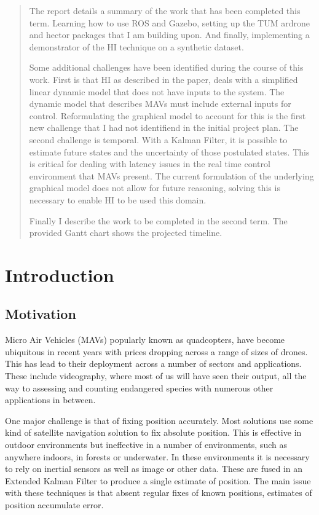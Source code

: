\documentclass[]{../resources/final_report}
\begin{document}
\begin{abstract}
The report details a summary of the work that has been completed this term. Learning how to
use ROS and Gazebo, setting up the TUM ardrone and hector packages that I am building upon. 
And finally, implementing a demonstrator of the HI technique on a synthetic dataset. 

Some additional challenges have been identified during the course of this work. First is that HI as described 
in the paper, deals with a simplified linear dynamic model that does not have inputs to the system.
The dynamic model that describes MAVs must include external inputs for control. Reformulating the 
graphical model to account for this is the first new challenge that I had not identifiend in the 
initial project plan. The second challenge is temporal. With a Kalman Filter, it is possible to 
estimate future states and the uncertainty of those postulated states. This is critical for dealing 
with latency issues in the real time control environment that MAVs present. The current formulation 
of the underlying graphical model does not allow for future reasoning, solving this is necessary to
enable HI to be used this domain.

Finally I describe the work to be completed in the second term. The provided Gantt chart shows the
projected timeline.

\end{abstract}
\newpage

\chapter{Introduction}


\section{Motivation}

Micro Air Vehicles (MAVs) popularly known as quadcopters, have become ubiquitous in recent years 
with prices dropping across a range of sizes of drones. This has lead to their deployment across 
a number of sectors and applications. These include videography, where most of us will have seen 
their output, all the way to assessing and counting endangered species with numerous other 
applications in between.

One major challenge is that of fixing position accurately. Most solutions use some kind of 
satellite navigation solution to fix absolute position. This is effective in outdoor environments
but ineffective in a number of environments, such as anywhere indoors, in forests or underwater.
In these environments it is necessary to rely on inertial sensors as well as image or other data. 
These are fused in an Extended Kalman Filter to produce a single estimate of position.
The main issue with these techniques is that absent regular fixes of known positions, estimates of
position accumulate error.
\end{document}
